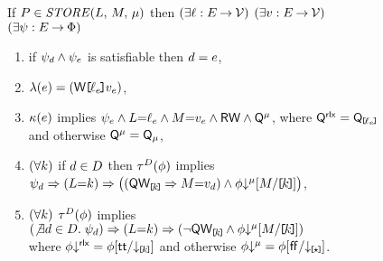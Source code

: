 \begin{figure*}
  \begin{center}
  \begin{minipage}{0.88\textwidth}
  \noindent
  If $\aPS \in \sSTORE[\amode]{\cExp}{\aExp}$ then
  $(\exists\cVal:\aEvs\fun\Val)$
  $(\exists\aVal:\aEvs\fun\Val)$
  $(\exists\bForm:\aEvs\fun\Formulae)$
  \begin{enumerate}
  \item if $\bForm_\bEv\land\bForm_\aEv$ is satisfiable then $\bEv=\aEv$,
  \item $\labelingAct(\aEv) = \DWREFP{\cVal_\aEv}{\aVal_\aEv}$,
  \item 
    $\labelingForm(\aEv)$ implies
    \begin{math}
      \bForm_\aEv
      \land \cExp{=}\cVal_\aEv
      \land \aExp{=}\aVal_\aEv
      \land \RW
      \land \Qmode{\amode}
    \end{math},
    where
    $\Qmode{\mRLX}=\QxREF{\cVal_\aEv}$ and otherwise $\Qmode{\amode}=\Q[\amode]$, %
  \item
    \begin{math}
      (\forall\dVal)
    \end{math}
    if
    $\bEv\in\bEvs$
    then
    $\aTr[\bEvs](\aForm)$ implies 
    \begin{math}
      \bForm_\bEv
      \limplies (\cExp{=}\dVal)
      \limplies \PBRbig{
        (\QwREF{\dVal} \limplies \aExp{=}\aVal_\bEv)
        \land \aForm \Dmode{\amode}[\aExp/\REF{\dVal}]
      }
    \end{math},
  \item %
    \begin{math}
      (\forall\dVal)
    \end{math}
    $\aTr[\bEvs](\aForm)$ implies 
    \begin{math}
      (\not\exists\bEv\in\bEvs.\; \bForm_\bEv)
      \limplies (\cExp{=}\dVal)
      \limplies \PBR{
        \lnot\QwREF{\dVal}
        \land \aForm \Dmode{\amode}[\aExp/\REF{\dVal}]
      }
    \end{math}
    \\ where 
      $\aForm\Dmode{\mRLX}=\aForm[\TRUE/\DxREF{\dVal}]$ and otherwise
      $\aForm\Dmode{\amode}=\aForm[\FALSE/\DREF]$. %
  \end{enumerate}

\end{minipage}
\end{center}
\end{figure*}
